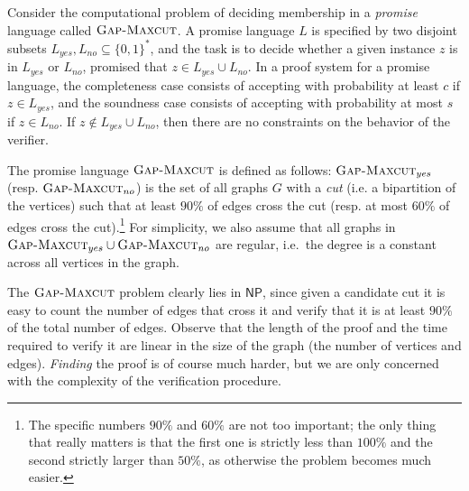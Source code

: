 \documentclass[11pt]{article}
\theoremstyle{definition}
\newcommand{\GX}{\textsc{Gap-Maxcut}}
\newcommand{\class}[1]{\ensuremath{\mathsf{#1}}\xspace}
\newcommand{\NP}{\class{NP}} %
\begin{document}


Consider the computational problem of deciding membership in a \emph{promise} language called $\GX$. 
A promise language $L$ is specified by two disjoint subsets $L_{yes},L_{no}\subseteq\{0,1\}^*$, and the task is to decide whether a given instance $z$ is in $L_{yes}$ or $L_{no}$, promised that $z \in L_{yes} \cup L_{no}$. In a proof system for a promise language, the completeness case consists of accepting with probability at least $c$ if $z \in L_{yes}$, and the soundness case consists of accepting with probability at most $s$ if $z \in L_{no}$. If $z \notin L_{yes} \cup L_{no}$, then there are no constraints on the behavior of the verifier.




The promise language $\GX$ is defined as follows: $\GX_{yes}$ (resp. $\GX_{no}$) is the set of all graphs $G$ %
with a \emph{cut} (i.e. a bipartition of the vertices) such that at least $90\%$ of edges cross the cut (resp. at most $60\%$ of edges cross the cut).\footnote{The specific numbers $90\%$ and $60\%$ are not too important; the only thing that really matters is that the first one is strictly less than $100\%$ and the second strictly larger than $50\%$, as otherwise the problem becomes much easier.} For simplicity, we also assume that all graphs in $\GX_{yes}\cup \GX_{no}$ are regular, i.e.\ the degree is a constant across all vertices in the graph. 

The $\GX$ problem clearly lies in $\NP$, since given a candidate cut it is easy to count the number of edges that cross it and verify that it is at least $90\%$ of the total number of edges. Observe that the length of the proof and the time required to verify it are linear in the size of the graph (the number of vertices and edges). \emph{Finding} the proof is of course much harder, but we are only concerned with the complexity of the verification procedure.
\end{document}
